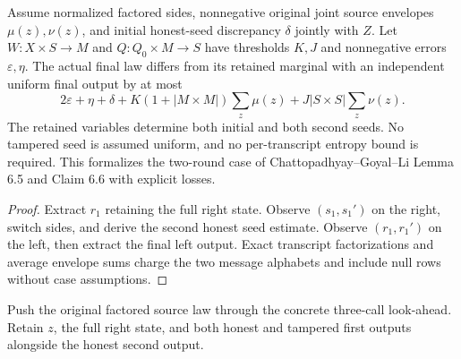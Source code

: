 \begin{theorem}
  \label{thm:lowerbounds-algebraic-lookahead-extraction}
  \leanok
  Assume normalized factored sides, nonnegative original joint source
  envelopes $\mu(z),\nu(z)$, and initial honest-seed discrepancy $\delta$
  jointly with $Z$. Let $W:X\times S\to M$ and $Q:Q_0\times M\to S$
  have thresholds $K,J$ and nonnegative errors $\varepsilon,\eta$.
  The actual final law differs from its retained marginal with an
  independent uniform final output by at most
  \[
    2\varepsilon+\eta+\delta+
    K(1+|M\times M|)\sum_z\mu(z)+J|S\times S|\sum_z\nu(z).
  \]
  The retained variables determine both initial and both second seeds.
  No tampered seed is assumed uniform, and no per-transcript entropy
  bound is required. This formalizes the two-round case of
  Chattopadhyay--Goyal--Li Lemma 6.5 and Claim 6.6 with explicit losses.
\end{theorem}
\begin{proof}
  \leanok
  Extract $r_1$ retaining the full right state. Observe $(s_1,s_1')$ on
  the right, switch sides, and derive the second honest seed estimate.
  Observe $(r_1,r_1')$ on the left, then extract the final left output.
  Exact transcript factorizations and average envelope sums charge the
  two message alphabets and include null rows without case assumptions.
\end{proof}

\begin{definition}
  \label{def:lowerbounds-algebraic-concrete-lookahead}
  \leanok
  Push the original factored source law through the concrete three-call
  look-ahead. Retain $z$, the full right state, and both honest and tampered
  first outputs alongside the honest second output.
\end{definition}

